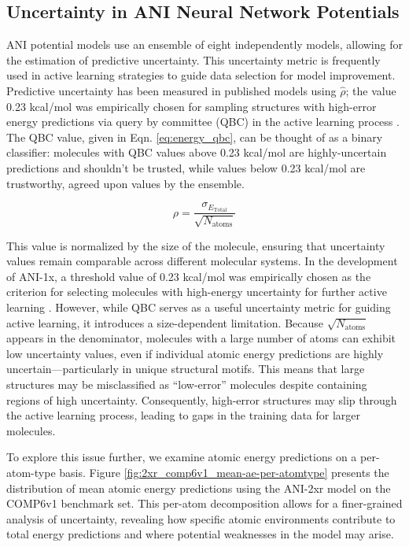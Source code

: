 \subsection{Uncertainty in ANI Neural Network Potentials}
\label{subsec:ANI_uncertainty}

ANI potential models use an ensemble of eight independently models, allowing for the estimation of predictive uncertainty.
This uncertainty metric is frequently used in active learning strategies to guide data selection for model improvement.
Predictive uncertainty has been measured in published models using $\hat{\rho}$; the value 0.23 kcal/mol was empirically chosen for sampling structures with high-error energy predictions via query by committee (QBC) in the active learning process \cite{ani-1x}.
The QBC value, given in Eqn. \ref{eq:energy_qbc}, can be thought of as a binary classifier: molecules with QBC values above 0.23 kcal/mol are highly-uncertain predictions and shouldn't be trusted, while values below 0.23 kcal/mol are trustworthy, agreed upon values by the ensemble.

\begin{equation}
\rho = \frac{\sigma_{E_{\text{Total}}}}{\sqrt{N_{\text{atoms}}}}
\label{eq:energy_qbc}
\end{equation}

This value is normalized by the size of the molecule, ensuring that uncertainty values remain comparable across different molecular systems. 
In the development of ANI-1x, a threshold value of 0.23 kcal/mol was empirically chosen as the criterion for selecting molecules with high-energy uncertainty for further active learning \cite{ani-1x}.
However, while QBC serves as a useful uncertainty metric for guiding active learning, it introduces a size-dependent limitation. 
Because $\sqrt{N_\text{atoms}}$ appears in the denominator, molecules with a large number of atoms can exhibit low uncertainty values, even if individual atomic energy predictions are highly uncertain---particularly in unique structural motifs. 
This means that large structures may be misclassified as “low-error” molecules despite containing regions of high uncertainty. 
Consequently, high-error structures may slip through the active learning process, leading to gaps in the training data for larger molecules.

To explore this issue further, we examine atomic energy predictions on a per-atom-type basis. 
Figure \ref{fig:2xr_comp6v1_mean-ae-per-atomtype} presents the distribution of mean atomic energy predictions using the ANI-2xr model on the COMP6v1 benchmark set. 
This per-atom decomposition allows for a finer-grained analysis of uncertainty, revealing how specific atomic environments contribute to total energy predictions and where potential weaknesses in the model may arise.

